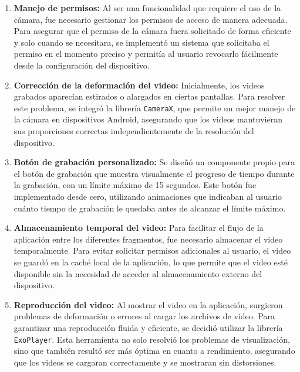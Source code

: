 \begin{enumerate}
    \item \textbf{Manejo de permisos:} Al ser una funcionalidad que requiere el uso de la cámara, fue necesario gestionar los permisos de acceso de manera adecuada. Para asegurar que el permiso de la cámara fuera solicitado de forma eficiente y solo cuando se necesitara, se implementó un sistema que solicitaba el permiso en el momento preciso y permitía al usuario revocarlo fácilmente desde la configuración del dispositivo.

    \item \textbf{Corrección de la deformación del video:} Inicialmente, los videos grabados aparecían estirados o alargados en ciertas pantallas. Para resolver este problema, se integró la librería \texttt{CameraX}, que permite un mejor manejo de la cámara en dispositivos Android, asegurando que los videos mantuvieran sus proporciones correctas independientemente de la resolución del dispositivo.

    \item \textbf{Botón de grabación personalizado:} Se diseñó un componente propio para el botón de grabación que muestra visualmente el progreso de tiempo durante la grabación, con un límite máximo de 15 segundos. Este botón fue implementado desde cero, utilizando animaciones que indicaban al usuario cuánto tiempo de grabación le quedaba antes de alcanzar el límite máximo.

    \item \textbf{Almacenamiento temporal del video:} Para facilitar el flujo de la aplicación entre los diferentes fragmentos, fue necesario almacenar el video temporalmente. Para evitar solicitar permisos adicionales al usuario, el video se guardó en la caché local de la aplicación, lo que permite que el video esté disponible sin la necesidad de acceder al almacenamiento externo del dispositivo.

    \item \textbf{Reproducción del video:} Al mostrar el video en la aplicación, surgieron problemas de deformación o errores al cargar los archivos de video. Para garantizar una reproducción fluida y eficiente, se decidió utilizar la librería \texttt{ExoPlayer}. Esta herramienta no solo resolvió los problemas de visualización, sino que también resultó ser más óptima en cuanto a rendimiento, asegurando que los videos se cargaran correctamente y se mostraran sin distorsiones.
\end{enumerate}


